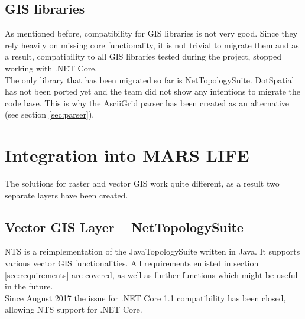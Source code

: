 \subsection{GIS libraries}
As mentioned before, compatibility for GIS libraries is not very good. Since they rely heavily on missing core functionality, it is not trivial to migrate them and as a result, compatibility to all GIS libraries tested during the project, stopped working with .NET Core.\\
The only library that has been migrated so far is NetTopologySuite. DotSpatial has not been ported yet and the team did not show any intentions to migrate the code base. This is why the AsciiGrid parser has been created as an alternative (see section \ref{sec:parser}).



\section{Integration into MARS LIFE}
The solutions for raster and vector GIS work quite different, as a result two separate layers have been created.


\subsection{Vector GIS Layer -- NetTopologySuite}
NTS is a reimplementation of the JavaTopologySuite written in Java. It supports various vector GIS functionalities. All requirements enlisted in section \ref{sec:requirements} are covered, as well as further functions which might be useful in the future.\\
Since August 2017 the issue for .NET Core 1.1 compatibility has been closed, allowing NTS support for .NET Core.


